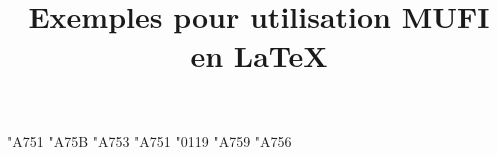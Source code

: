 \documentclass{article}
\title{Exemples pour utilisation MUFI en \LaTeX{}}
\begin{document}
	
	\newcommand\pro{\char"A753\xspace}
	\newcommand\per{\char"A751\xspace}
	\newcommand\eced{\char"0119\xspace}
	\newcommand\quod{\char"A759\xspace}
	\newcommand\Quod{\char"A756\xspace}
	
	\char"A751
	\char"A75B
	\pro{}
	\per{}
	\eced{}
	\quod{}
	\Quod{}
	
\end{document}
